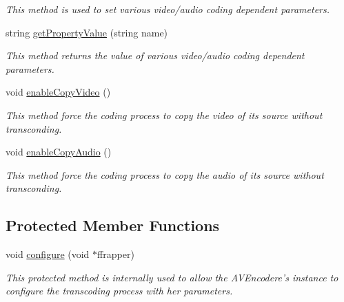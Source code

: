 \begin{DoxyCompactItemize}
\begin{DoxyCompactList}\small\item\em This method is used to set various video/audio coding dependent parameters. \item\end{DoxyCompactList}\item 
string \hyperlink{classbr_1_1ufscar_1_1lince_1_1streaming_1_1AVEncoder_a79f96fe18d52c9e4b622977165cc228a}{getPropertyValue} (string name)
\begin{DoxyCompactList}\small\item\em This method returns the value of various video/audio coding dependent parameters. \item\end{DoxyCompactList}\item 
void \hyperlink{classbr_1_1ufscar_1_1lince_1_1streaming_1_1AVEncoder_aa611299f6eaf0232f3530b8bfe0c23e3}{enableCopyVideo} ()
\begin{DoxyCompactList}\small\item\em This method force the coding process to copy the video of its source without transconding. \item\end{DoxyCompactList}\item 
void \hyperlink{classbr_1_1ufscar_1_1lince_1_1streaming_1_1AVEncoder_a512c848e6cfd6a4464c529611c246ffe}{enableCopyAudio} ()
\begin{DoxyCompactList}\small\item\em This method force the coding process to copy the audio of its source without transconding. \item\end{DoxyCompactList}\end{DoxyCompactItemize}
\subsection*{Protected Member Functions}
\begin{DoxyCompactItemize}
\item 
void \hyperlink{classbr_1_1ufscar_1_1lince_1_1streaming_1_1AVEncoder_abdda25898b06cfaf3f9271b847a8da24}{configure} (void $\ast$ffrapper)
\begin{DoxyCompactList}\small\item\em This protected method is internally used to allow the AVEncodere's instance to configure the transcoding process with her parameters. \item\end{DoxyCompactList}\end{DoxyCompactItemize}
